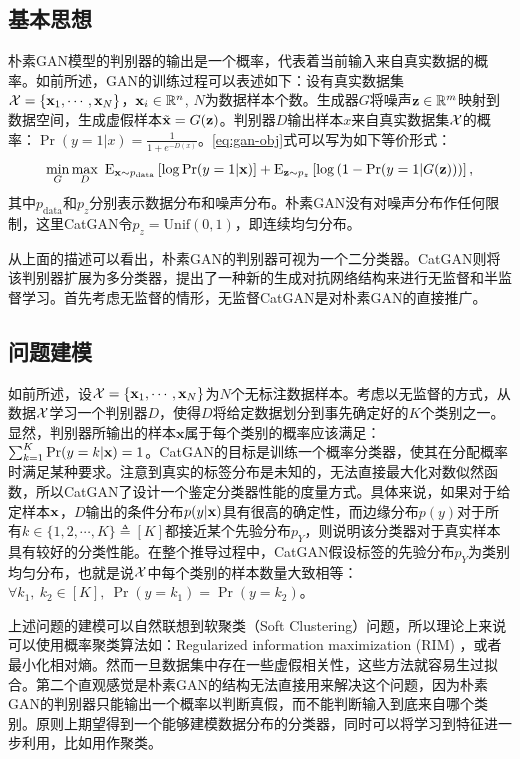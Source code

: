\subsection{基本思想}
朴素GAN模型的判别器的输出是一个概率，代表着当前输入来自真实数据的概率。如前所述，GAN的训练过程可以表述如下：设有真实数据集$\mathcal{X} = \{\mathbf{x}_1, \cdots, \mathbf{x}_N\}$，$\mathbf{x}_i \in \mathbb{R}^n$, $N$为数据样本个数。生成器$G$将噪声$\mathbf{z}\in \mathbb{R}^m$映射到数据空间，生成虚假样本$\tilde{\mathbf{x}} = G(\mathbf{z})$。判别器$D$输出样本$x$来自真实数据集$\mathcal{X}$的概率：$\Pr(y=1 | x) = \frac{1}{1 + e^{-D(x)}}$。\eqref{eq:gan-obj}式可以写为如下等价形式：
\begin{equation}
  \min_G\max_D ~\text{E}_{\mathbf{x} \sim p_{\text{data}}} \left[ \log \Pr(y=1|\mathbf{x}) \right]
  + \text{E}_{\mathbf{z} \sim p_z} \left[ \log\left( 1 - \Pr(y=1|G(\mathbf{z})) \right) \right],
\end{equation}
其中$p_{\text{data}}$和$p_z$分别表示数据分布和噪声分布。朴素GAN没有对噪声分布作任何限制，这里CatGAN令$p_z = \text{Unif}(0,1)$，即连续均匀分布。

从上面的描述可以看出，朴素GAN的判别器可视为一个二分类器。CatGAN则将该判别器扩展为多分类器，提出了一种新的生成对抗网络结构来进行无监督和半监督学习。首先考虑无监督的情形，无监督CatGAN是对朴素GAN的直接推广。

\subsection{问题建模}\label{sec:catgan-ps}
如前所述，设$\mathcal{X} = \{\mathbf{x}_1, \cdots, \mathbf{x}_N\}$为$N$个无标注数据样本。考虑以无监督的方式，从数据$\mathcal{X}$学习一个判别器$D$，使得$D$将给定数据划分到事先确定好的$K$个类别之一。
显然，判别器所输出的样本$\mathbf{x}$属于每个类别的概率应该满足：$\sum_{k=1}^K \Pr(y=k|\mathbf{x}) = 1$。CatGAN的目标是训练一个概率分类器，使其在分配概率时满足某种要求。注意到真实的标签分布是未知的，无法直接最大化对数似然函数，所以CatGAN了设计一个鉴定分类器性能的度量方式。具体来说，如果对于给定样本$\mathbf{x}$，$D$输出的条件分布$p(y|\mathbf{x})$具有很高的确定性，而边缘分布$p(y)$对于所有$k \in \{1,2,\cdots,K\} \triangleq [K]$都接近某个先验分布$p_Y$，则说明该分类器对于真实样本具有较好的分类性能。在整个推导过程中，CatGAN假设标签的先验分布$p_Y$为类别均匀分布，也就是说$\mathcal{X}$中每个类别的样本数量大致相等：$\forall k_1, ~k_2 \in [K], ~\Pr(y=k_1) = \Pr(y=k_2)$。

上述问题的建模可以自然联想到软聚类（Soft Clustering）问题，所以理论上来说可以使用概率聚类算法如：Regularized information maximization (RIM) \citep{krause2010discriminative}，或者最小化相对熵\citep{grandvalet2005semi}。然而一旦数据集中存在一些虚假相关性，这些方法就容易生过拟合。第二个直观感觉是朴素GAN的结构无法直接用来解决这个问题，因为朴素GAN的判别器只能输出一个概率以判断真假，而不能判断输入到底来自哪个类别。原则上期望得到一个能够建模数据分布的分类器，同时可以将学习到特征进一步利用，比如用作聚类。

